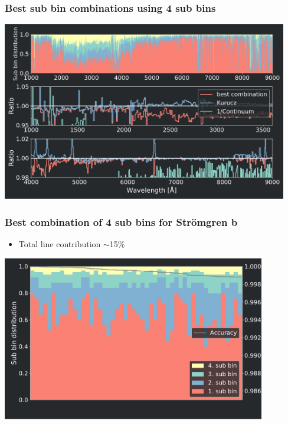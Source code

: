 \frame
{
	\frametitle{Best sub bin combinations using 4 sub bins}
	\includegraphics[width=125mm]{images/best_combination_finder_0}
}
\frame
{
	\frametitle{Best combination of 4 sub bins for Str\"omgren b}
	\begin{itemize}
		\item Total line contribution $\sim$15\%
	\end{itemize}
	\centering
	\includegraphics[width=115mm]{images/optimal_stroemgren_1_c_b}
}

